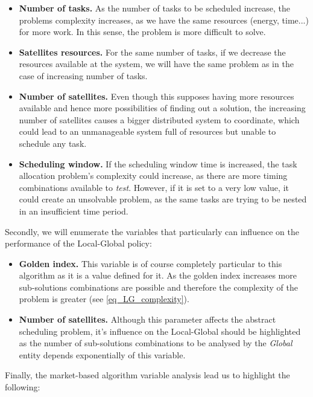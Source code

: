 \begin{itemize}
\item \textbf{Number of tasks. } As the number of tasks to be scheduled increase, the problems complexity increases, as we have the same resources (energy, time...) for more work. In this sense, the problem is more difficult to solve.

\item \textbf{Satellites resources. } For the same number of tasks, if we decrease the resources available at the system, we will have the same problem as in the case of increasing number of tasks.

\item \textbf{Number of satellites. } Even though this supposes having more resources available and hence more possibilities of finding out a solution, the increasing number of satellites causes a bigger distributed system to coordinate, which could lead to an unmanageable system full of resources but unable to schedule any task.

\item \textbf{Scheduling window. } If the scheduling window time is increased, the task allocation problem's complexity could increase, as there are more timing combinations available to \emph{test}. However, if it is set to a very low value, it could create an unsolvable problem, as the same tasks are trying to be nested in an insufficient time period.
\end{itemize}

Secondly, we will enumerate the variables that particularly can influence on the performance of the Local-Global policy:

\begin{itemize}
\item \textbf{Golden index. } This variable is of course completely particular to this algorithm as it is a value defined for it. As the golden index increases more sub-solutions combinations are possible and therefore the complexity of the problem is greater (see \ref{eq_LG_complexity}).

\item \textbf{Number of satellites. } Although this parameter affects the abstract scheduling problem, it's influence on the Local-Global should be highlighted as the number of sub-solutions combinations to be analysed by the \emph{Global} entity depends exponentially of this variable.
\end{itemize}

Finally, the market-based algorithm variable analysis lead us to highlight the following:

